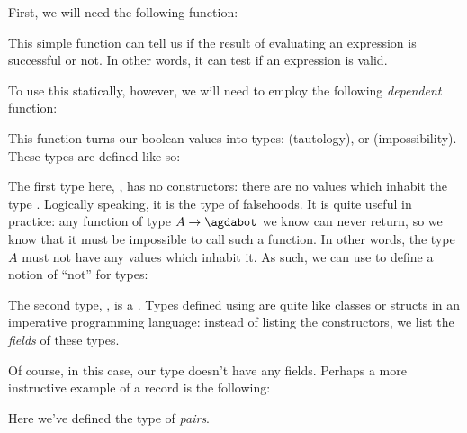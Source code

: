 First, we will need the following function:
\begin{agdalisting*}
\end{agdalisting*}
This simple function can tell us if the result of evaluating an expression is
successful or not.
In other words, it can test if an expression is valid.

To use this statically, however, we will need to employ the following
\emph{dependent} function:
\begin{agdalisting*}
\end{agdalisting*}
This function turns our boolean values into types: \agdatop\;(tautology), or
\agdabot\;(impossibility).
These types are defined like so:
\begin{multicols}{2}
  \begin{agdalisting*}
  \end{agdalisting*}  \columnbreak
  \begin{agdalisting*}
  \end{agdalisting*}
\end{multicols}
The first type here, \agdabot, has no constructors: there are no values which
inhabit the type \agdabot.
Logically speaking, it is the type of falsehoods.
It is quite useful in practice: any function of type \(A \rightarrow \agdabot\)
we know can never return, so we know that it must be impossible to call such a
function.
In other words, the type \(A\) must not have any values which inhabit it.
As such, we can use \agdabot\;to define a notion of ``not'' for types:
\begin{agdalisting*}
\end{agdalisting*}

The second type, \agdatop, is a .
Types defined using  are quite like classes or structs
in an imperative programming language: instead of listing the constructors, we list
the \emph{fields} of these types.

Of course, in this case, our type doesn't have any fields.
Perhaps a more instructive example of a record is the following:
\begin{agdalisting} \label{pair-def}
\end{agdalisting}
Here we've defined the type of \emph{pairs}.


